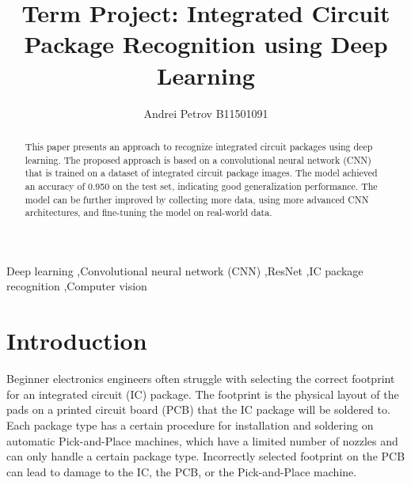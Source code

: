\documentclass[preprint,12pt,3p,times]{elsarticle}
\begin{document}
\begin{frontmatter}

\title{Term Project: Integrated Circuit Package Recognition using Deep Learning}


 \author[1]{Andrei Petrov B11501091}


\address[1]{Department of Civil Engineering, National Taiwan University, Taipei, Taiwan}


\begin{abstract}
	This paper presents an approach to recognize integrated circuit packages using deep learning. The proposed approach is based on a convolutional neural network (CNN) that is trained on a dataset of integrated circuit package images. The model achieved an accuracy of 0.950 on the test set, indicating good generalization performance. The model can be further improved by collecting more data, using more advanced CNN architectures, and fine-tuning the model on real-world data.

\end{abstract}

\begin{keyword}
	Deep learning \sep Convolutional neural network (CNN) \sep ResNet \sep IC package recognition \sep Computer vision
\end{keyword}

\end{frontmatter}

\section{Introduction}
Beginner electronics engineers often struggle with selecting the correct footprint for an integrated circuit (IC) package. The footprint is the physical layout of the pads on a printed circuit board (PCB) that the IC package will be soldered to. Each package type has a certain procedure for installation and soldering on automatic Pick-and-Place machines, which have a limited number of nozzles and can only handle a certain package type. Incorrectly selected footprint on the PCB can lead to damage to the IC, the PCB, or the Pick-and-Place machine.
\end{document}
